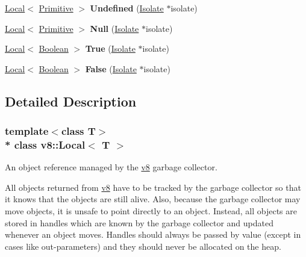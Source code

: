 \begin{DoxyCompactItemize}
\item 
\hyperlink{classv8_1_1Local}{Local}$<$ \hyperlink{classv8_1_1Primitive}{Primitive} $>$ {\bfseries Undefined} (\hyperlink{classv8_1_1Isolate}{Isolate} $\ast$isolate)\hypertarget{classv8_1_1Local_a696a04c5f02bf0aeedd1e5a539587de4}{}\label{classv8_1_1Local_a696a04c5f02bf0aeedd1e5a539587de4}

\item 
\hyperlink{classv8_1_1Local}{Local}$<$ \hyperlink{classv8_1_1Primitive}{Primitive} $>$ {\bfseries Null} (\hyperlink{classv8_1_1Isolate}{Isolate} $\ast$isolate)\hypertarget{classv8_1_1Local_a6a29184b023bde58d4af2bba2d249a35}{}\label{classv8_1_1Local_a6a29184b023bde58d4af2bba2d249a35}

\item 
\hyperlink{classv8_1_1Local}{Local}$<$ \hyperlink{classv8_1_1Boolean}{Boolean} $>$ {\bfseries True} (\hyperlink{classv8_1_1Isolate}{Isolate} $\ast$isolate)\hypertarget{classv8_1_1Local_aa5944f05409b5572b14793eff33a7908}{}\label{classv8_1_1Local_aa5944f05409b5572b14793eff33a7908}

\item 
\hyperlink{classv8_1_1Local}{Local}$<$ \hyperlink{classv8_1_1Boolean}{Boolean} $>$ {\bfseries False} (\hyperlink{classv8_1_1Isolate}{Isolate} $\ast$isolate)\hypertarget{classv8_1_1Local_ae8e414a3a8b3e1f2fa60c24e4dda0c4a}{}\label{classv8_1_1Local_ae8e414a3a8b3e1f2fa60c24e4dda0c4a}

\end{DoxyCompactItemize}


\subsection{Detailed Description}
\subsubsection*{template$<$class T$>$\\*
class v8\+::\+Local$<$ T $>$}

An object reference managed by the \hyperlink{namespacev8}{v8} garbage collector.

All objects returned from \hyperlink{namespacev8}{v8} have to be tracked by the garbage collector so that it knows that the objects are still alive. Also, because the garbage collector may move objects, it is unsafe to point directly to an object. Instead, all objects are stored in handles which are known by the garbage collector and updated whenever an object moves. Handles should always be passed by value (except in cases like out-\/parameters) and they should never be allocated on the heap.

